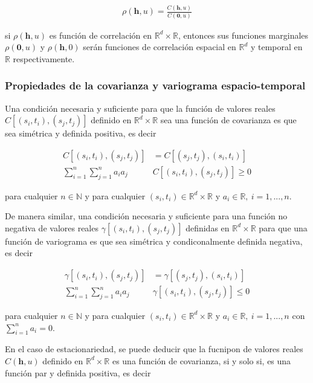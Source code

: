 \documentclass[
]{book}
\begin{document}
\begin{align}
\rho(\textbf{h},u)=\frac{C(\textbf{h},u)}{C(\textbf{0},u)}
\end{align}

si \(\rho(\textbf{h},u)\) es función de correlación en \(\mathbb{R}^d \times \mathbb{R}\), entonces sus funciones marginales \(\rho(\textbf{0},u)\) y \(\rho(\textbf{h},0)\) serán funciones de correlación espacial en \(\mathbb{R}^d\) y temporal en \(\mathbb{R}\) respectivamente.

\hypertarget{propiedades-de-la-covarianza-y-variograma-espacio-temporal}{%
\subsubsection{Propiedades de la covarianza y variograma espacio-temporal}\label{propiedades-de-la-covarianza-y-variograma-espacio-temporal}}

Una condición necesaria y suficiente para que la función de valores reales \(C[(s_i,t_i),(s_j,t_j)]\) definido en \(\mathbb{R}^d \times \mathbb{R}\) sea una función de covarianza es que sea simétrica y definida positiva, es decir

\begin{align}
C[(s_i,t_i),(s_j,t_j)]&=C[(s_j,t_j),(s_i,t_i)]\\
\sum_
{i=1}^{n}\sum_
{j=1}^{n}a_ia_j&C[(s_i,t_i),(s_j,t_j)] \geq 0
\end{align}

para cualquier \(n\in \mathbb{N}\) y para cualquier \((s_i,t_i) \in \mathbb{R}^d \times \mathbb{R}\) y \(a_i\in \mathbb{R},\ i=1,...,n\).

De manera similar, una condición necesaria y suficiente para una función no negativa de valores reales \(\gamma[(s_i,t_i),(s_j,t_j)]\) definidas en \(\mathbb{R}^d \times \mathbb{R}\) para que una función de variograma es que sea simétrica y condiconalmente definida negativa, es decir

\begin{align}
\gamma[(s_i,t_i),(s_j,t_j)]&=\gamma[(s_j,t_j),(s_i,t_i)]\\
\sum_
{i=1}^{n}\sum_
{j=1}^{n}a_ia_j&\gamma[(s_i,t_i),(s_j,t_j)] \leq 0
\end{align}

para cualquier \(n\in \mathbb{N}\) y para cualquier \((s_i,t_i) \in \mathbb{R}^d \times \mathbb{R}\) y \(a_i\in \mathbb{R},\ i=1,...,n\) con \(\sum_{i=1}^na_i=0\).

En el caso de estacionariedad, se puede deducir que la fucnipon de valores reales \(C(\textbf{h},u)\) definido en \(\mathbb{R}^d \times \mathbb{R}\) es una función de covarianza, si y solo si, es una función par y definida positiva, es decir
\end{document}
